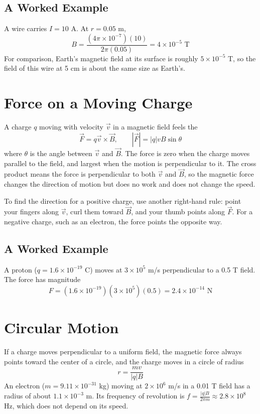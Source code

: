 \subsection{A Worked Example}
A wire carries $I = 10$ A. At $r = 0.05$ m,
$$B = \frac{(4\pi \times 10^{-7})(10)}{2\pi(0.05)} = 4 \times 10^{-5} \text{ T}$$
For comparison, Earth's magnetic field at its surface is roughly $5 \times 10^{-5}$ T, so the field of this wire at 5 cm is about the same size as Earth's.

\section{Force on a Moving Charge}
A charge $q$ moving with velocity $\vec{v}$ in a magnetic field feels the 
$$\vec{F} = q\vec{v} \times \vec{B}, \qquad |\vec{F}| = |q|vB\sin\theta$$
where $\theta$ is the angle between $\vec{v}$ and $\vec{B}$. The force is zero when the charge moves parallel to the field,
and largest when the motion is perpendicular to it. The cross product means the force is perpendicular to both $\vec{v}$ and $\vec{B}$,
so the magnetic force changes the direction of motion but does no work and does not change the speed.

To find the direction for a positive charge, use another right-hand rule:
point your fingers along $\vec{v}$, curl them toward $\vec{B}$, and your
thumb points along $\vec{F}$. For a negative charge, such as an electron,
the force points the opposite way.

\subsection{A Worked Example}
A proton ($q = 1.6 \times 10^{-19}$ C) moves at $3 \times 10^5$ m/s perpendicular to a 0.5 T field. The force has magnitude
$$F = (1.6 \times 10^{-19})(3 \times 10^5)(0.5) = 2.4 \times 10^{-14} \text{ N}$$

\section{Circular Motion}
If a charge moves perpendicular to a uniform field, the magnetic force always points toward the center of a circle, and the charge
moves in a circle of radius
$$r = \frac{mv}{|q|B}$$
An electron ($m = 9.11 \times 10^{-31}$ kg) moving at $2 \times 10^6$ m/s in a 0.01 T field has a radius of about $1.1 \times 10^{-3}$ m.
Its frequency of revolution is $f = \frac{|q|B}{2\pi m} \approx 2.8 \times 10^8$ Hz, which does not depend on its speed.

